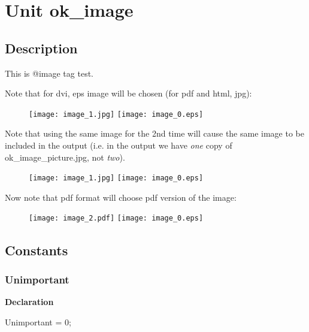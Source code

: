 \documentclass{report}
\begin{document}
\newlength{\tmplength}
\chapter{Unit ok{\_}image}
\section{Description}
This is @image tag test.\hfill\vspace*{1ex}



Note that for dvi, eps image will be chosen (for pdf and html, jpg):

\begin{figure}
  \ifpdf
    \texttt{[image: image\_1.jpg]}
  \else
    \texttt{[image: image\_0.eps]}
  \fi
\end{figure}


Note that using the same image for the 2nd time will cause the same image to be included in the output (i.e. in the output we have \textit{one} copy of ok{\_}image{\_}picture.jpg, not \textit{two}).

\begin{figure}
  \ifpdf
    \texttt{[image: image\_1.jpg]}
  \else
    \texttt{[image: image\_0.eps]}
  \fi
\end{figure}


Now note that pdf format will choose pdf version of the image:

\begin{figure}
  \ifpdf
    \texttt{[image: image\_2.pdf]}
  \else
    \texttt{[image: image\_0.eps]}
  \fi
\end{figure}

\section{Constants}
\subsection*{Unimportant}
\begin{list}{}{
\setlength{\itemindent}{0cm}
\setlength{\listparindent}{0cm}
\setlength{\leftmargin}{\evensidemargin}
\addtolength{\leftmargin}{\tmplength}
\settowidth{\labelsep}{X}
\addtolength{\leftmargin}{\labelsep}
\setlength{\labelwidth}{\tmplength}
}
\begin{flushleft}
\item[\textbf{Declaration}\hfill]
\begin{ttfamily}
Unimportant = 0;\end{ttfamily}


\end{flushleft}
\end{list}
\end{document}
